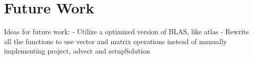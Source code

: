 \chapter{Future Work}

Ideas for future work:
 - Utilize a optimized version of BLAS, like atlas
 - Rewrite all the functions to use vector and matrix operations instead of manually implementing project, advect and setupSolution
